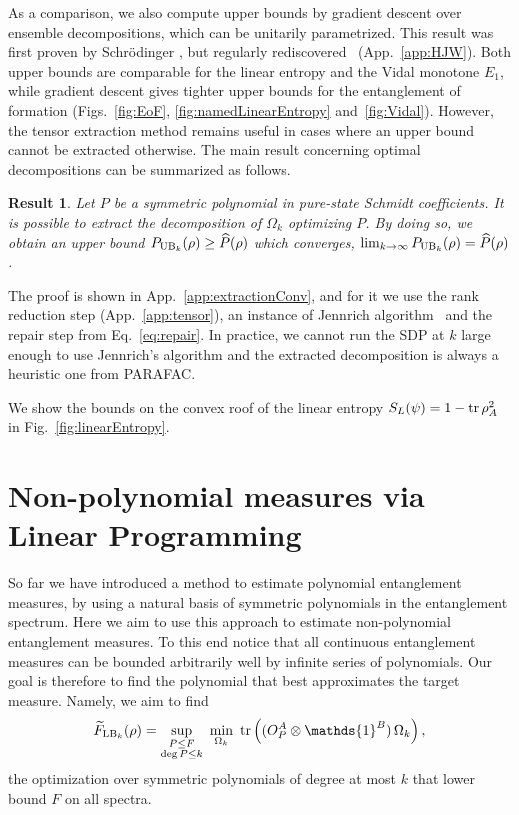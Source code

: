 \documentclass[aps,pra,twocolumn,superscriptaddress]{revtex4-2}
\newcommand{\one}{\mathds{1}}
\newcommand{\I}{\one}
\newtheorem{result}[theorem]{Result}
\begin{document}
As a comparison, we also compute upper bounds by gradient descent over ensemble decompositions, which can be unitarily parametrized. This result was first proven by Schrödinger \cite{schrodinger36}, but regularly rediscovered~\cite{jaynes57, gisin89, HJW,  kirkpatrick06} (App.~\ref{app:HJW}). Both upper bounds are comparable for the linear entropy and the Vidal monotone $E_1$, while gradient descent gives tighter upper bounds for the entanglement of formation (Figs.~\ref{fig:EoF}, \ref{fig:namedLinearEntropy} and~\ref{fig:Vidal}). However, the tensor extraction method remains useful in cases where an upper bound cannot be extracted otherwise. The main result concerning optimal decompositions can be summarized as follows.

\begin{result}\label{thm:extraction}
    Let $P$ be a symmetric polynomial in pure-state Schmidt coefficients.
    It is possible to extract the decomposition of $\Omega_k$ optimizing $P$. By doing so, we obtain an upper bound $P_{{\rm UB}_k}(\rho)\geq \widehat{P}(\rho)$ which converges, $\lim_{k\rightarrow\infty}P_{{\rm UB}_k}(\rho)=\widehat{P}(\rho)$.
\end{result}

The proof is shown in App.~\ref{app:extractionConv}, and for it we use the rank reduction step (App.~\ref{app:tensor}), an instance of Jennrich algorithm~\cite{Harshman1970,Leurgans1993} and the repair step from Eq.~\eqref{eq:repair}. In practice, we cannot run the SDP at $k$ large enough to use Jennrich's algorithm and the extracted decomposition is always a heuristic one from PARAFAC.

We show the bounds on the convex roof of the linear entropy $S_L(\psi)=1-\tr\rho_A^2$ in Fig.~\ref{fig:linearEntropy}.



\section{Non-polynomial measures via Linear Programming}\label{sec:LP}

So far we have introduced a method to estimate polynomial entanglement measures, by using a natural basis of symmetric polynomials in the entanglement spectrum. Here we aim to use this approach to estimate non-polynomial entanglement measures. To this end notice that all continuous entanglement measures can be bounded arbitrarily well by infinite series of polynomials. Our goal is therefore to find the polynomial that best approximates the target measure. Namely, we aim to find
\begin{equation}\label{eq:FLBexact}
    \widetilde{F}_{{\rm LB}_k}(\rho)=\sup_{\substack{P\leq F\\ \deg P\leq k}}\ \min_{\Omega_k}\ \tr\left((O_P^A\otimes\I^B)\,\Omega_k\right),
\end{equation}
the optimization over symmetric polynomials of degree at most $k$ that lower bound $F$ on all spectra.
\end{document}

